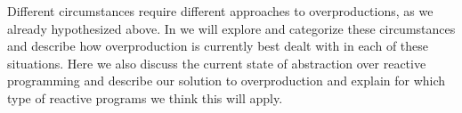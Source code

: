 Different circumstances require different approaches to overproductions, as we already hypothesized above. In  we will explore and categorize these circumstances and describe how overproduction is currently best dealt with in each of these situations. Here we also discuss the current state of abstraction over reactive programming and describe our solution to overproduction and explain for which type of reactive programs we think this will apply.

